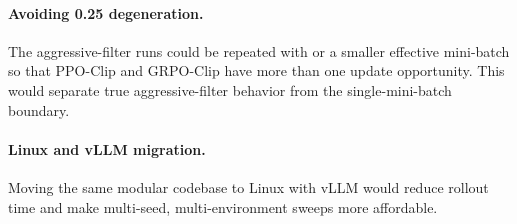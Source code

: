 \paragraph{Avoiding 0.25 degeneration.}
The aggressive-filter runs could be repeated with  or a smaller effective mini-batch so that PPO-Clip and GRPO-Clip have more than one update opportunity. This would separate true aggressive-filter behavior from the single-mini-batch boundary.

\paragraph{Linux and vLLM migration.}
Moving the same modular codebase to Linux with vLLM would reduce rollout time and make multi-seed, multi-environment sweeps more affordable.
